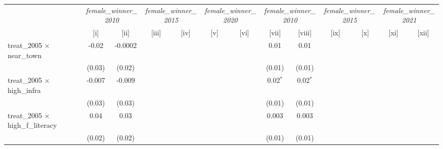 
\begingroup
\centering
\scriptsize
\begin{adjustbox}{max width=\linewidth}
   \begin{threeparttable}[b]
      \begin{tabular}{lcccccccccccc}
         \toprule
          & \multicolumn{2}{c}{\textit{female\_winner\_2010}} & \multicolumn{2}{c}{\textit{female\_winner\_2015}} & \multicolumn{2}{c}{\textit{female\_winner\_2020}} & \multicolumn{2}{c}{\textit{female\_winner\_2010}} & \multicolumn{2}{c}{\textit{female\_winner\_2015}} & \multicolumn{2}{c}{\textit{female\_winner\_2021}}\\
                                                    & [i]           & [ii]          & [iii]         & [iv]          & [v]           & [vi]          & [vii]         & [viii]        & [ix]          & [x]           & [xi]          & [xii]\\  
         \midrule 
         treat\_2005 $\times$ near\_town            & -0.02         & -0.0002       &               &               &               &               & 0.01          & 0.01          &               &               &               &   \\   
                                                    & (0.03)        & (0.02)        &               &               &               &               & (0.01)        & (0.01)        &               &               &               &   \\   
         treat\_2005 $\times$ high\_infra           & -0.007        & -0.009        &               &               &               &               & 0.02$^{*}$    & 0.02$^{*}$    &               &               &               &   \\   
                                                    & (0.03)        & (0.03)        &               &               &               &               & (0.01)        & (0.01)        &               &               &               &   \\   
         treat\_2005 $\times$ high\_f\_literacy     & 0.04          & 0.03          &               &               &               &               & 0.003         & 0.003         &               &               &               &   \\   
                                                    & (0.02)        & (0.02)        &               &               &               &               & (0.01)        & (0.01)        &               &               &               &   \\   

\end{tabular}
\end{threeparttable}
\end{adjustbox}
